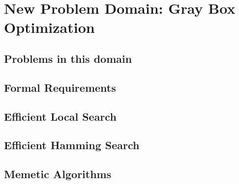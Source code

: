 \chapter{New Problem Domain: Gray Box Optimization}

\section{Problems in this domain}

\section{Formal Requirements}

\section{Efficient Local Search}

\section{Efficient Hamming Search}

\section{Memetic Algorithms}
